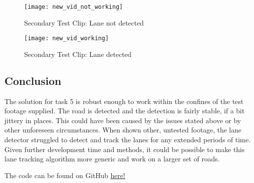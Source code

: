 \documentclass[conference]{IEEEtran}
\begin{document}
\begin{figure}[H]
\centerline{\texttt{[image: new\_vid\_not\_working]}}
\caption{Secondary Test Clip: Lane not detected}
\label{fig:new_vid_not_working}
\end{figure}

\begin{figure}[H]
\centerline{\texttt{[image: new\_vid\_working]}}
\caption{Secondary Test Clip: Lane detected}
\label{fig:new_vid_working}
\end{figure}

\subsection{Conclusion}

The solution for task 5 is robust enough to work within the confines of the test footage supplied. The road is detected and the detection is fairly stable, if a bit jittery in places. This could have been caused by the issues stated above or by other unforeseen circumstances. When shown other, untested footage, the lane detector struggled to detect and track the lanes for any extended periods of time. Given further development time and methods, it could be possible to make this lane tracking algorithm more generic and work on a larger set of roads. 




The code can be found on GitHub \href{https://github.com/LukeDWaller99/Aint308}{here!} 

\onecolumn
\end{document}
